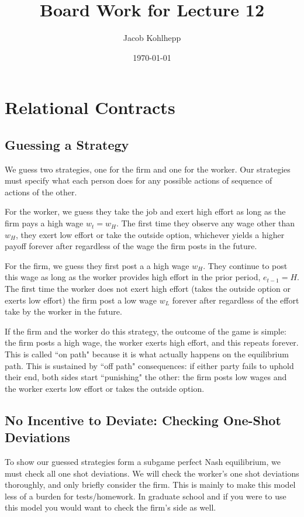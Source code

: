 \documentclass{article}
\title{Board Work for Lecture 12}
\author{Jacob Kohlhepp}
\date{\today}
\begin{document}
\maketitle


\section{Relational Contracts}

\subsection{Guessing a Strategy}

We guess two strategies, one for the firm and one for the worker. Our strategies must specify what each person does for any possible actions of sequence of actions of the other.

For the worker, we guess they take the job and exert high effort as long as the firm pays a high wage $w_t=w_H$. The first time they  observe any wage other than $w_H$, they exert low effort or take the outside option, whichever yields a higher payoff forever after regardless of the wage the firm posts in the future.

For the firm, we guess they first post a a high wage $w_H$. They continue to post this wage as long as the worker provides high effort in the prior period, $e_{t-1}=H$. The first time the worker does not exert high effort (takes the outside option or exerts low effort) the firm post a low wage $w_L$ forever after regardless of the effort take by the worker in the future.

If the firm and the worker do this strategy, the outcome of the game is simple: the firm posts a high wage, the worker exerts high effort, and this repeats forever. This is called ``on path" because it is what actually happens on the equilibrium path. This is sustained by ``off path" consequences: if either party fails to uphold their end, both sides start ``punishing" the other: the firm posts low wages and the worker exerts low effort or takes the outside option.




\subsection{No Incentive to Deviate: Checking One-Shot Deviations}

To show our guessed strategies form a subgame perfect Nash equilibrium, we must check all one shot deviations. We will check the worker's one shot deviations thoroughly, and only briefly consider the firm. This is mainly to make this model less of a burden for tests/homework. In graduate school and if you were to use this model you would want to check the firm's side as well.
\end{document}
